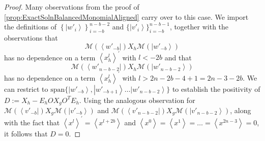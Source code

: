 \documentclass{theoretics}
\begin{document}
\begin{proof}
  Many observations from the proof of \cref{prop:ExactSolnBalancedMonomialAligned}
  carry over to this case. We import the definitions of $\left\{ \left|w'_{i}\right\rangle \right\} _{i=-b}^{n-b-2}$
  and $\{\left|v'_{i}\right\rangle \}_{i=-b}^{n-b-1}$, together with
  the observations that $$\mathcal{M}(\left\langle w'_{-b}\right|)X_{h}\mathcal{M}(\left|w'_{-b}\right\rangle )$$
  has no dependence on a term $\left\langle x_{h}^{l}\right\rangle ^{\prime}$
  with $l<-2b$
  and that $$\mathcal{M}(\left\langle w'_{n-b-2}\right|)X_{h}\mathcal{M}(\left|w'_{n-b-2}\right\rangle )$$
  has no dependence on a term $\left\langle x_{h}^{l}\right\rangle ^{\prime}$
  with $l>2n-2b-4+1=2n-3-2b$. We can restrict to $\text{span}\{\left|w'_{-b}\right\rangle ,\left|w'_{-b+1}\right\rangle \dots\left|w'_{n-b-2}\right\rangle \}$
  to establish the positivity of $D:=X_{h}-E_{h}OX_{g}O^{T}E_{h}$.
  Using the analogous observation for $\mathcal{M}(\left\langle v'_{-b}\right|)X_{g}\mathcal{M}(\left|v'_{-b}\right\rangle )$
  and $\mathcal{M}(\left\langle v'_{n-b-2}\right|)X_{g}\mathcal{M}(\left|v'_{n-b-2}\right\rangle )$,
  along with the fact that $\left\langle x^{l}\right\rangle ^{\prime}=\left\langle x^{l+2b}\right\rangle $
  and $\left\langle x^{0}\right\rangle =\left\langle x^{1}\right\rangle =\dots=\left\langle x^{2n-3}\right\rangle =0$,
  it follows that $D=0$.
\end{proof}
\end{document}
